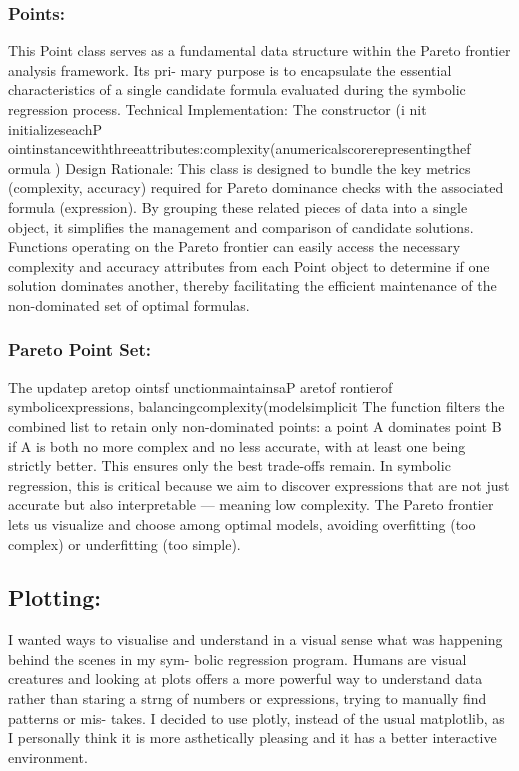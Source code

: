 \documentclass{article}
\begin{document}
\subsubsection{Points:}

This Point class serves as a fundamental data structure within the Pareto frontier analysis framework. Its pri-
mary purpose is to encapsulate the essential characteristics of a single candidate formula evaluated during the
symbolic regression process.
Technical Implementation: The constructor (i nit initializeseachP ointinstancewiththreeattributes:complexity(anumericalscorerepresentingthef ormula
)
Design Rationale: This class is designed to bundle the key metrics (complexity, accuracy) required for Pareto
dominance checks with the associated formula (expression). By grouping these related pieces of data into a
single object, it simplifies the management and comparison of candidate solutions. Functions operating on
the Pareto frontier can easily access the necessary complexity and accuracy attributes from each Point object to
determine if one solution dominates another, thereby facilitating the efficient maintenance of the non-dominated
set of optimal formulas.\\


\subsubsection{Pareto Point Set:}

The updatep aretop ointsf unctionmaintainsaP aretof rontierof symbolicexpressions, balancingcomplexity(modelsimplicit
The function filters the combined list to retain only non-dominated points: a point A dominates point B if A is
both no more complex and no less accurate, with at least one being strictly better. This ensures only the best
trade-offs remain.
In symbolic regression, this is critical because we aim to discover expressions that are not just accurate but
also interpretable — meaning low complexity. The Pareto frontier lets us visualize and choose among optimal
models, avoiding overfitting (too complex) or underfitting (too simple).\\ 


\subsection{Plotting: }

I wanted ways to visualise and understand in a visual sense what was happening behind the scenes in my sym-
bolic regression program. Humans are visual creatures and looking at plots offers a more powerful way to understand data rather than staring a strng of numbers or expressions, trying to manually find patterns or mis-
takes.
I decided to use plotly, instead of the usual matplotlib, as I personally think it is more asthetically pleasing and
it has a better interactive environment.\\ 
\end{document}

